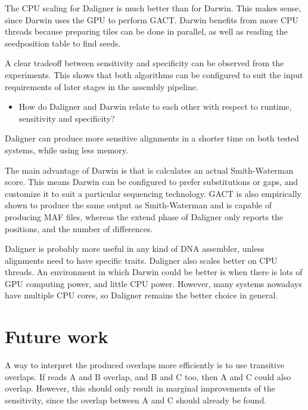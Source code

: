 \documentclass[../thesis.tex]{subfiles}
\begin{document}
The CPU scaling for Daligner is much better than for Darwin.
This makes sense, since Darwin uses the GPU to perform GACT.
Darwin benefits from more CPU threads because preparing tiles can be done in parallel, as well as reading the seedposition table to find seeds.

A clear tradeoff between sensitivity and specificity can be observed from the experiments.
This shows that both algorithms can be configured to suit the input requirements of later stages in the assembly pipeline.



\begin{itemize}
\item How do Daligner and Darwin relate to each other with respect to runtime, sensitivity and specificity?
\end{itemize}
Daligner can produce more sensitive alignments in a shorter time on both tested systems, while using less memory.

The main advantage of Darwin is that is calculates an actual Smith-Waterman score.
This means Darwin can be configured to prefer substitutions or gaps, and customize it to suit a particular sequencing technology.
GACT is also empirically shown to produce the same output as Smith-Waterman and is capable of producing MAF files, whereas the extend phase of Daligner only reports the positions, and the number of differences.

Daligner is probably more useful in any kind of DNA assembler, unless alignments need to have specific traits.
Daligner also scales better on CPU threads.
An environment in which Darwin could be better is when there is lots of GPU computing power, and little CPU power.
However, many systems nowadays have multiple CPU cores, so Daligner remains the better choice in general.

\section{Future work}





A way to interpret the produced overlaps more efficiently is to use transitive overlaps.
If reads A and B overlap, and B and C too, then A and C could also overlap.
However, this should only result in marginal improvements of the sensitivity, since the overlap between A and C should already be found.
\end{document}
